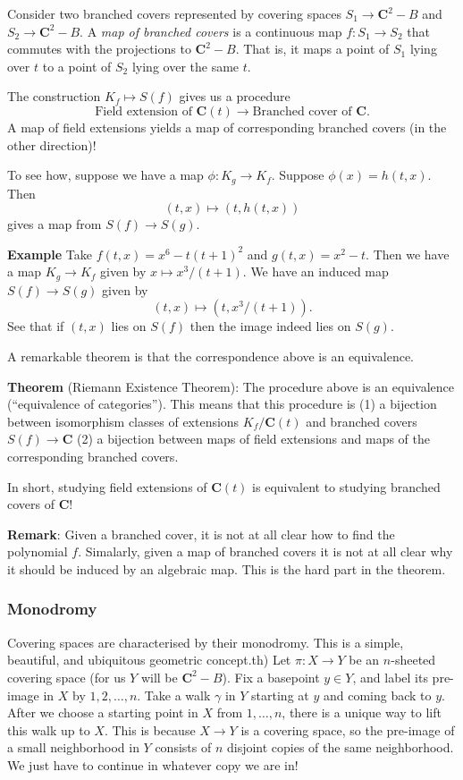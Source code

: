 \documentclass[11pt]{article}
\begin{document}
Consider two branched covers represented by covering spaces \(S_1 \to \mathbf{C}^2-B\) and \(S_2 \to \mathbf{C}^2-B\).
A \emph{map of branched covers} is a continuous map \(f \colon S_1 \to S_2\) that commutes with the projections to \(\mathbf{C}^2-B\).
That is, it maps a point of \(S_1\) lying over \(t\) to a point of \(S_2\) lying over the same \(t\).

The construction \(K_f \mapsto S(f)\) gives us a procedure
\[ \text{Field extension of } \mathbf{C}(t)  \to \text{Branched cover of } \mathbf{C}.\]
A map of field extensions yields a map of corresponding branched covers (in the other direction)!

To see how, suppose we have a map \(\phi \colon K_g \to K_f\).
Suppose \(\phi(x) = h(t,x)\).
Then
\[ (t,x) \mapsto (t, h(t,x))\]
gives a map from \(S(f) \to S(g)\).

\textbf{\textbf{Example}}
Take \(f(t,x) = x^6-t(t+1)^{2}\) and \(g(t,x) = x^2 - t\).
Then we have a map \(K_g \to K_f\) given by \(x \mapsto x^3/(t+1)\).
We have an induced map \(S(f) \to S(g)\) given by
\[ (t,x) \mapsto (t,x^3/(t+1)).\]
See that if \((t,x)\) lies on \(S(f)\) then the image indeed lies on \(S(g)\).

A remarkable theorem is that the correspondence above is an equivalence.

\textbf{\textbf{Theorem}} (Riemann Existence Theorem):
The procedure above is an equivalence (``equivalence of categories'').
This means that this procedure is (1) a bijection between isomorphism classes of extensions \(K_f / \mathbf{C}(t)\) and branched covers \(S(f) \to \mathbf{C}\)  (2) a bijection between maps of field extensions and maps of the corresponding branched covers.

In short, studying field extensions of \(\mathbf{C}(t)\) is equivalent to studying branched covers of \(\mathbf{C}\)!

\textbf{\textbf{Remark}}: Given a branched cover, it is not at all clear how to find the polynomial \(f\).  Simalarly, given a map of branched covers it is not at all clear why it should be induced by an algebraic map.  This is the hard part in the theorem.
\subsubsection{Monodromy}
\label{sec:orgbc992d3}
Covering spaces are characterised by their monodromy.
This is a simple, beautiful, and ubiquitous geometric concept.th)
Let \(\pi \colon X \to Y\) be an \(n\)-sheeted covering space (for us \(Y\) will be \(\mathbf{C}^2 - B\)).
Fix a basepoint \(y \in Y\), and label its pre-image in \(X\) by \(1,2,\dots,n\).
Take a walk \(\gamma\) in \(Y\) starting at \(y\) and coming back to \(y\).
After we choose a starting point in \(X\) from \(1,\dots, n\), there is a unique way to lift this walk up to \(X\).
This is because \(X \to Y\) is a covering space, so the pre-image of a small neighborhood in \(Y\) consists of \(n\) disjoint copies of the same neighborhood.
We just have to continue in whatever copy we are in!
\end{document}
